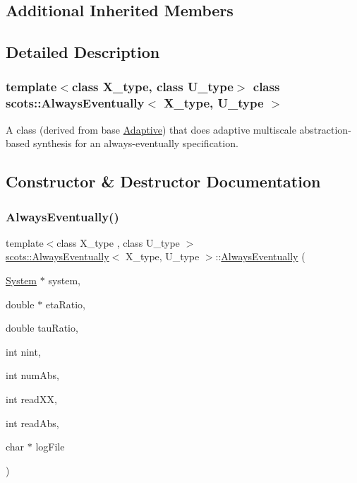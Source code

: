 \subsection*{Additional Inherited Members}


\subsection{Detailed Description}
\subsubsection*{template$<$class X\+\_\+type, class U\+\_\+type$>$\newline
class scots\+::\+Always\+Eventually$<$ X\+\_\+type, U\+\_\+type $>$}

A class (derived from base \hyperlink{classscots_1_1Adaptive}{Adaptive}) that does adaptive multiscale abstraction-\/based synthesis for an always-\/eventually specification. 

\subsection{Constructor \& Destructor Documentation}
\mbox{\label{classscots_1_1AlwaysEventually_a7d9f12e625ead9e0cbd0787a9e7d786e}} 
\subsubsection{\texorpdfstring{Always\+Eventually()}{AlwaysEventually()}}
{\footnotesize\ttfamily template$<$class X\+\_\+type , class U\+\_\+type $>$ \\
\hyperlink{classscots_1_1AlwaysEventually}{scots\+::\+Always\+Eventually}$<$ X\+\_\+type, U\+\_\+type $>$\+::\hyperlink{classscots_1_1AlwaysEventually}{Always\+Eventually} (\begin{DoxyParamCaption}\item[{\hyperlink{classscots_1_1System}{System} $\ast$}]{system,  }\item[{double $\ast$}]{eta\+Ratio,  }\item[{double}]{tau\+Ratio,  }\item[{int}]{nint,  }\item[{int}]{num\+Abs,  }\item[{int}]{read\+XX,  }\item[{int}]{read\+Abs,  }\item[{char $\ast$}]{log\+File }\end{DoxyParamCaption})\hspace{0.3cm}{\ttfamily [inline]}}

